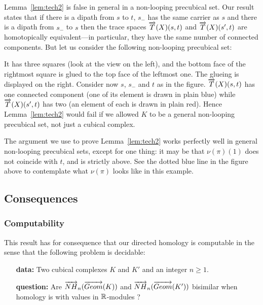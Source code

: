 Lemma~\ref{lem:tech2} is false in general in a non-looping
precubical set. Our result states that if there is a dipath from $s$ to $t$, $s_-$
has the same carrier as $s$ and there is a dipath from $s_-$ to $s$ then the
trace spaces $\overrightarrow{T}(X)(s,t)$ and $\overrightarrow{T}(X)(s',t)$ are
homotopically equivalent---in particular, they have the same number of
connected components. But let us consider the following non-looping
precubical set:

\begin{figure}[H]
  \begin{center}
    	
  \end{center}
\end{figure}

It has three squares (look at the view on the left), and the bottom
face of the rightmost square is glued to the top face of the
leftmost one. The glueing is displayed on the right. Consider now $s$,
$s_-$ and $t$ as in the figure. $\overrightarrow{T}(X)(s,t)$ has one connected
component (one of its element is drawn in plain blue) while
$\overrightarrow{T}(X)(s',t)$ has two (an element of each is drawn in plain
red).  Hence Lemma~\ref{lem:tech2} would fail if we allowed
$K$ to be a general non-looping precubical set, not just a cubical complex.

The argument we use to prove Lemma~\ref{lem:tech2} works
perfectly well in general non-looping precubical sets, except for one
thing: it may be that $\nu (\pi) (1)$ does not coincide with $t$, and
is strictly above.  See the dotted blue line in the figure above to
contemplate what $\nu (\pi)$ looks like in this example.


\subsection{Consequences}
	\subsubsection{Computability}
	
	This result has for consequence that our directed homology is computable in the sense that the following problem is decidable:
	\begin{itemize}
		\item[\textbf{data:}] Two cubical complexes $K$ and $K'$ and an integer $n \geq 1$.
		\item[\textbf{question:}] Are $\overrightarrow{NH}_{n}(\overrightarrow{Geom}(K))$ and $\overrightarrow{NH}_{n}(\overrightarrow{Geom}(K'))$ bisimilar when homology is with values in $\mathbb{R}$-modules ?
	\end{itemize}
	
